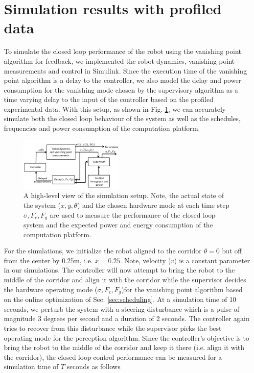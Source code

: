 \section{Simulation results with profiled data}
\label{sec:simResults}

To simulate the closed loop performance of the robot using the vanishing point algorithm for feedback, we implemented the robot dynamics, vanishing point measurements and control in Simulink. Since the execution time of the vanishing point algorithm is a delay to the controller, we also model the delay and power consumption for the vanishing mode chosen by the supervisory algorithm as a time varying delay to the input of the controller based on the profiled experimental data. With this setup, as shown in Fig. \ref{fig:simSetup}, we can accurately simulate both the closed loop behaviour of the system as well as the schedules, frequencies and power consumption of the computation platform.



\begin{figure}[hbtp]
\centering
\includegraphics[width=0.46\textwidth]{Figs/SimulationSetup_scissored.pdf}
\caption{A high-level view of the simulation setup. Note, the actual state of the system ($x,y,\theta$) and the chosen hardware mode at each time step $\sigma,F_c,F_g$ are used to measure the performance of the closed loop system and the expected power and energy consumption of the computation platform.}
\label{fig:simSetup} %
\end{figure}

For the simulations, we initialize the robot aligned to the corridor $\theta=0$ but off from the center by 0.25m, i.e. $x=0.25$. Note, velocity ($v$) is a constant parameter in our simulations. The controller will now attempt to bring the robot to the middle of the corridor and align it with the corridor while the supervisor decides the hardware operating mode ($\sigma,F_c,F_g$)for the vanishing point algorithm based on the online optimization of Sec. \ref{sec:scheduling}. At a simulation time of 10 seconds, we perturb the system with a steering disturbance which is a pulse of magnitude 3 degrees per second and a duration of 2 seconds. The controller again tries to recover from this disturbance while the supervisor picks the best operating mode for the perception algorithm. Since the controller's objective is to bring the robot to the middle of the corridor and keep it there (i.e. align it with the corridor), the closed loop control performance can be measured for a simulation time of $T$ seconds as follows


